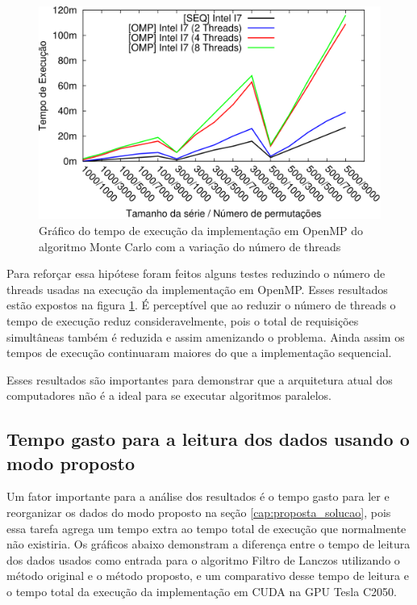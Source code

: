 \begin{figure}[H]
\centering
\includegraphics[]{Imagens/graficos_mcarlo/mcarlo_omp-threads.png}
\caption{Gráfico do tempo de execução da implementação em OpenMP do algoritmo Monte Carlo com a variação do número de threads}
\label{fig:grafico_mcarlo_omp_threads}
\end{figure}

Para reforçar essa hipótese foram feitos alguns testes reduzindo o número de threads usadas na execução da implementação em OpenMP. Esses resultados estão expostos na figura \ref{fig:grafico_mcarlo_omp_threads}. É perceptível que ao reduzir o número de threads o tempo de execução reduz consideravelmente, pois o total de requisições simultâneas também é reduzida e assim amenizando o problema. Ainda assim os tempos  de execução continuaram maiores do que a implementação sequencial.

Esses resultados são importantes para demonstrar que a arquitetura atual dos computadores não é a ideal para se executar algoritmos paralelos.

\subsection{Tempo gasto para a leitura dos dados usando o modo proposto}

Um fator importante para a análise dos resultados é o tempo gasto para ler e reorganizar os dados do modo proposto na seção \ref{cap:proposta_solucao}, pois essa tarefa agrega um tempo extra ao tempo total de execução que normalmente não existiria. Os gráficos abaixo demonstram a diferença entre o tempo de leitura dos dados usados como entrada para o algoritmo Filtro de Lanczos utilizando o método original e o método proposto, e um comparativo desse tempo de leitura e o tempo total da execução da implementação em CUDA na GPU Tesla C2050.

